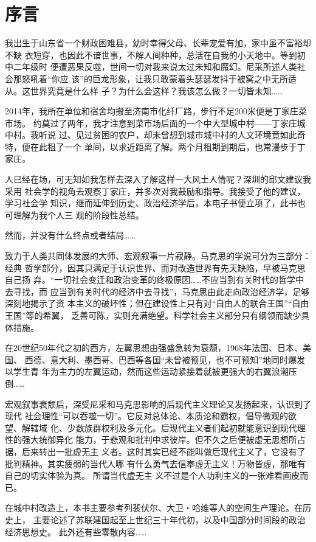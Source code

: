 \chapter{序言}
\label{chap:preface}

我出生于山东省一个财政困难县，幼时幸得父母、长辈宠爱有加，家中虽不富裕却不缺
衣短穿，也因此不谙世事，不解人间种种，总活在自我的小天地中。等到初中二年级时
便遭恶果反噬，世间一切对我来说太过未知和魔幻。尼采所述人类社会那怒吼着“你应
该”的巨龙形象，让我只敢蒙着头瑟瑟发抖于被窝之中无所适从。这世界究竟是什么样
子？为什么会这样？我该怎么做？一切皆未知……

2014年，我所在单位和宿舍均搬至济南市化纤厂路，步行不足200米便是丁家庄菜市场。
约莫过了两年，我才注意到菜市场后面的一个中大型城中村——丁家庄城中村。我听说
过、见过贫困的农户，却未曾想到城市城中村的人文环境竟如此奇特，便在此租了一个
单间，以求近距离了解。两个月租期到期后，也常漫步于丁家庄。

人已经在场，可无知如我怎样去深入了解这样一大风土人情呢？深圳的邱文建议我采用
社会学的视角去观察丁家庄，并多次对我鼓励和指导。我接受了他的建议，学习社会学
知识，继而延伸到历史、政治经济学后，本电子书便立项了，此书也可理解为我个人三
观的阶段性总结。

然而，并没有什么终点或者结局……

致力于人类共同体发展的大师、宏观叙事一片寂静。马克思的学说可分为三部分：经典
哲学部分，因其只满足于认识世界、而对改造世界有先天缺陷，早被马克思自己扬
弃。“一切社会变迁和政治变革的终极原因……不应当到有关时代的哲学中去寻找，而
应当到有关时代的经济中去寻找”，马克思由此走向政治经济学，足够深刻地揭示了资
本主义的破坏性；但在建设性上只有对“自由人的联合王国”“自由王国”等的希翼，
乏善可陈，实则充满绝望。科学社会主义部分只有纲领而缺少具体措施。

在20世纪50年代之初的西方，左翼思想由强盛急转为衰颓，1968年法国、日本、美国、
西德、意大利、墨西哥、巴西等各国“未曾被预见，也不可预知”地同时爆发以学生青
年为主力的左翼运动，然而这些运动紧接着就被更强大的右翼浪潮压倒……

宏观叙事衰颓后，深受尼采和马克思影响的后现代主义理论又发扬起来，认识到了现代
社会理性“可以吞噬一切”。它反对总体论、本质论和霸权，倡导微观的欲望、解辖域
化、少数族群权利及多元化。后现代主义者们起初就能意识到现代理性的强大统御异化
能力，于悲观和批判中求彼岸。但不久之后便被虚无思想所占据，后来转出一批虚无主
义者。这时其实已经不能叫做后现代主义了，它没有了批判精神。其实疲弱的当代人哪
有什么勇气去信奉虚无主义！万物皆虚，那唯有自己的切实体验为真。 所谓当代虚无主
义不过是个人功利主义的一张难看画皮而已。

在城中村改造上，本书主要参考列裴伏尔、大卫・哈维等人的空间生产理论。在历史上，
主要论述了苏联建国起至上世纪三十年代初，以及中国部分时间段的政治经济思想史。
此外还有些零散内容……

